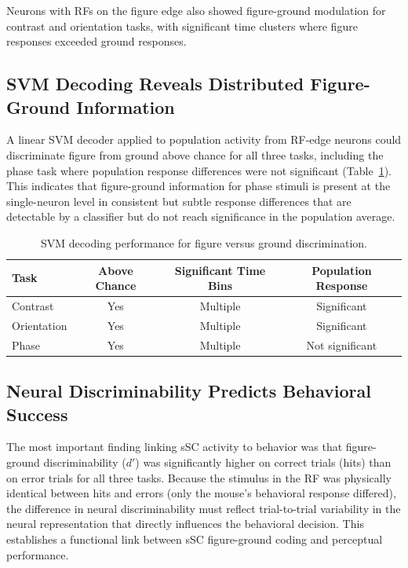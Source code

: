 \documentclass[12pt]{article}
\begin{document}
Neurons with RFs on the figure edge also showed figure-ground modulation for contrast and orientation tasks, with significant time clusters where figure responses exceeded ground responses.

\subsection{SVM Decoding Reveals Distributed Figure-Ground Information}

A linear SVM decoder applied to population activity from RF-edge neurons could discriminate figure from ground above chance for all three tasks, including the phase task where population response differences were not significant (Table~\ref{tab:svm}). This indicates that figure-ground information for phase stimuli is present at the single-neuron level in consistent but subtle response differences that are detectable by a classifier but do not reach significance in the population average.

\begin{table}[htbp]
\centering
\caption{SVM decoding performance for figure versus ground discrimination.}
\label{tab:svm}
\begin{tabular}{lccc}
\toprule
Task & Above Chance & Significant Time Bins & Population Response \\
\midrule
Contrast & Yes & Multiple & Significant \\
Orientation & Yes & Multiple & Significant \\
Phase & Yes & Multiple & Not significant \\
\bottomrule
\end{tabular}
\end{table}

\subsection{Neural Discriminability Predicts Behavioral Success}

The most important finding linking sSC activity to behavior was that figure-ground discriminability ($d'$) was significantly higher on correct trials (hits) than on error trials for all three tasks. Because the stimulus in the RF was physically identical between hits and errors (only the mouse's behavioral response differed), the difference in neural discriminability must reflect trial-to-trial variability in the neural representation that directly influences the behavioral decision. This establishes a functional link between sSC figure-ground coding and perceptual performance.
\end{document}
